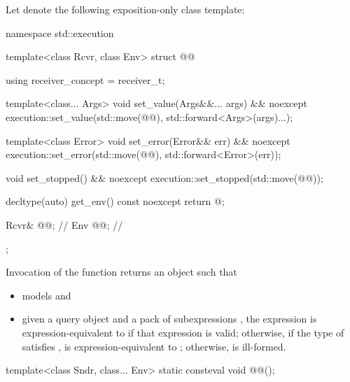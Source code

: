 \pnum
Let  denote the following exposition-only class template:
\begin{codeblock}
namespace std::execution {
  template<class Rcvr, class Env>
  struct @@ {
    using receiver_concept = receiver_t;

    template<class... Args>
    void set_value(Args&&... args) && noexcept {
      execution::set_value(std::move(@@), std::forward<Args>(args)...);
    }

    template<class Error>
    void set_error(Error&& err) && noexcept {
      execution::set_error(std::move(@@), std::forward<Error>(err));
    }

    void set_stopped() && noexcept {
      execution::set_stopped(std::move(@@));
    }

    decltype(auto) get_env() const noexcept {
      return @\seebelow@;
    }

    Rcvr& @@;                 // \expos
    Env @@;                    // \expos
  };
}
\end{codeblock}
Invocation of the function 
returns an object  such that
\begin{itemize}
\item
{} models  and
\item
given a query object  and a pack of subexpressions ,
the expression  is expression-equivalent
to  if that expression is valid;
otherwise,
if the type of  satisfies ,
 is expression-equivalent
to ;
otherwise,
 is ill-formed.
\end{itemize}

\begin{itemdecl}
template<class Sndr, class... Env>
  static consteval void @@();
\end{itemdecl}

